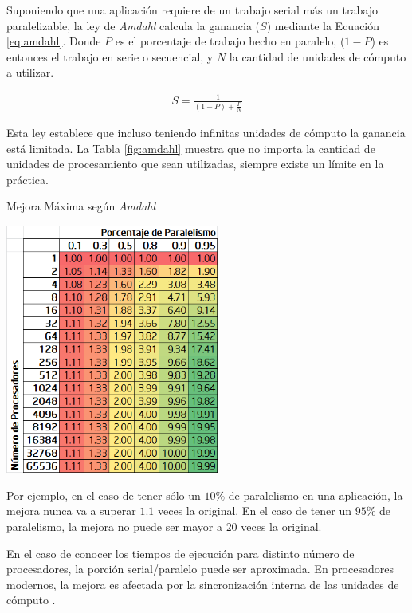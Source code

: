 \documentclass[a4paper]{report}
\begin{document}
\bigskip

Suponiendo que una aplicación requiere de un trabajo serial más un trabajo paralelizable, la ley de {\it Amdahl} calcula la ganancia ($ S $) mediante la Ecuación \ref{eq:amdahl}.
Donde $ P $ es el porcentaje de trabajo hecho en paralelo, ($ 1-P $) es entonces el trabajo en serie o secuencial, y $ N $ la cantidad de unidades de cómputo a utilizar.

\begin{eqnarray}
\label{eq:amdahl}
S = \frac{1}{(1 - P) + \frac{P}{N}}
\end{eqnarray}

Esta ley establece que incluso teniendo infinitas unidades de cómputo la ganancia está limitada.
La Tabla \ref{fig:amdahl} muestra que no importa la cantidad de unidades de procesamiento que sean utilizadas, siempre existe un límite en la práctica.

\begin{table}[H]
\caption{Mejora Máxima según {\it Amdahl}}
\centering
\includegraphics[width=7cm]{amdahl.png}

\label{fig:amdahl}
\end{table}

Por ejemplo, en el caso de tener sólo un $ 10\% $ de paralelismo en una aplicación, la mejora nunca va a superar $ 1.1 $ veces la original.
En el caso de tener un $ 95\% $ de paralelismo, la mejora no puede ser mayor a $ 20 $ veces la original.

\bigskip

En el caso de conocer los tiempos de ejecución para distinto número de procesadores, la porción serial/paralelo puede ser aproximada.
En procesadores modernos, la mejora es afectada por la sincronización interna de las unidades de cómputo \cite{amdahlmulticore}.
\end{document}
